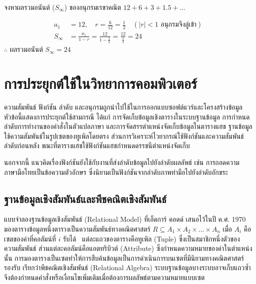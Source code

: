 \begin{ex}
\label{ex:infinite-geometric-series}
จงหาผลรวมอนันต์ ($S_\infty$) ของอนุกรมเรขาคณิต $12 + 6 + 3 + 1.5 + \dots$
\end{ex}
\begin{solution}
\begin{align*}
a_1 &= 12, \quad r = \frac{6}{12} = \frac{1}{2} \quad (\lvert r \rvert < 1 \text{ อนุกรมจึงลู่เข้า})\\
S_\infty &= \frac{a_1}{1-r} = \frac{12}{1 - \tfrac{1}{2}} = \frac{12}{\tfrac{1}{2}} = 24
\end{align*}
$\therefore$ ผลรวมอนันต์ $S_\infty = 24$ \solhere
\end{solution}

\section{การประยุกต์ใช้ในวิทยาการคอมพิวเตอร์}
\label{sec:relation-applications}

ความสัมพันธ์ ฟังก์ชัน ลำดับ และอนุกรมถูกนำไปใช้ในการออกแบบซอฟต์แวร์และโครงสร้างข้อมูล หัวข้อนี้แสดงการประยุกต์ใช้สามกรณี ได้แก่ การจัดเก็บข้อมูลเชิงตารางในระบบฐานข้อมูล การกำหนดลำดับการทำงานของคำสั่งในตัวแปลภาษา และการจัดสรรตำแหน่งจัดเก็บข้อมูลในตารางแฮช ฐานข้อมูลใช้ความสัมพันธ์ในรูปเซตของทูเพิลโดยตรง ส่วนการวิเคราะห์ไวยากรณ์ใช้ฟังก์ชันและความสัมพันธ์ลำดับก่อนหลัง ขณะที่ตารางแฮชใช้ฟังก์ชันแฮชกำหนดดรรชนีตำแหน่งจัดเก็บ~\parencite{gersting2014structures}

นอกจากนี้ แนวคิดเรื่องฟังก์ชันยังใช้กับงานที่ส่งลำดับข้อมูลไปยังลำดับผลลัพธ์ เช่น การถอดความภาษามือไทยเป็นข้อความตัวอักษร ซึ่งนิยามเป็นฟังก์ชันจากลำดับภาพท่ามือไปยังลำดับอักขระ~\parencite{nakjai2021transcription}

\subsection{ฐานข้อมูลเชิงสัมพันธ์และพีชคณิตเชิงสัมพันธ์}
แบบจำลองฐานข้อมูลเชิงสัมพันธ์ (Relational Model) ที่เอ็ดการ์ คอดด์ เสนอไว้ในปี ค.ศ. 1970 มองตารางข้อมูลหนึ่งตารางเป็นความสัมพันธ์ทางคณิตศาสตร์ $R \subseteq A_1 \times A_2 \times \dots \times A_n$ เมื่อ $A_i$ คือเซตของค่าที่คอลัมน์ที่ $i$ รับได้~\parencite{codd1970relational} แต่ละแถวของตารางคือทูเพิล (Tuple) ซึ่งเป็นสมาชิกหนึ่งตัวของความสัมพันธ์ ส่วนแต่ละคอลัมน์คือแอตทริบิวต์ (Attribute) ซึ่งกำหนดความหมายของค่าในตำแหน่งนั้น การมองตารางเป็นเซตทำให้การสืบค้นข้อมูลเป็นการดำเนินการบนเซตที่มีนิยามทางคณิตศาสตร์รองรับ เรียกว่าพีชคณิตเชิงสัมพันธ์ (Relational Algebra) ระบบฐานข้อมูลบางระบบอาจเก็บแถวซ้ำ จึงต้องกำหนดคำสั่งหรือเงื่อนไขเพิ่มเติมเมื่อต้องการผลลัพธ์ตามความหมายแบบเซต


